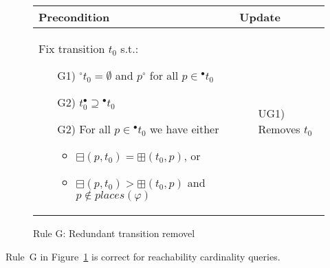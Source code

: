 \begin{figure}[h!]
    \vspace{4mm}

    \begin{adjustbox}{center}
        \begin{tabular}{|p{76mm}|p{40mm}|} \hline
        Precondition & Update \\ \hline
        Fix transition $t_0$ s.t.:
        \begin{itemize}[leftmargin=10mm]
            \item[G1)] ${}^\circ t_0=\emptyset$ and $p^\circ$ for all $p\in{}^\bullet t_0$
            \item[G2)] $t_0^\bullet\supseteq{}^\bullet t_0$
            \item[G2)] For all $p\in{}^\bullet t_0$ we have either
            \begin{itemize}[leftmargin=3mm]
                \item $\boxminus(p, t_0)=\boxplus(t_0, p)$, or
                \item $\boxminus(p, t_0)>\boxplus(t_0, p)$ and $p\notin places(\varphi)$
            \end{itemize}
        \end{itemize}
        &
        \begin{itemize}[leftmargin=10mm]
            \item[UG1)] Removes $t_0$
        \end{itemize} \\ \hline
        \end{tabular}
    \end{adjustbox}
    \caption{Rule G: Redundant transition removel}
    \label{fig:rule_g}
\end{figure}

\begin{theorem}\label{theorem:rule_g}
    Rule~G in Figure~\ref{fig:rule_g} is correct for reachability cardinality queries.
\end{theorem}
